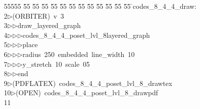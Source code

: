 %
%
\begin{tabbing}
55555 \= 55 \= 55 \= 55 \= 55 \= 55 \= 55 \= 55 \= 55 \= 55 \= 55 \= 55 \= 55 \= \>codes\_8\_4\_4\_draw:\\[0pt]
2\>$\triangleright$\>(ORBITER)\ v\ 3\ \\[0pt]
3\>$\triangleright$\>$\triangleright$\>draw\_layered\_graph\ \\[0pt]
4\>$\triangleright$\>$\triangleright$\>$\triangleright$\>codes\_8\_4\_4\_poset\_lvl\_8layered\_graph\ \\[0pt]
5\>$\triangleright$\>$\triangleright$\>$\triangleright$\>place\ \\[0pt]
6\>$\triangleright$\>$\triangleright$\>$\triangleright$\>radius\ 250\ embedded\ line\_width\ 10\ \\[0pt]
7\>$\triangleright$\>$\triangleright$\>$\triangleright$\>y\_stretch\ 10\ scale\ 05\ \\[0pt]
8\>$\triangleright$\>$\triangleright$\>end\\[0pt]
9\>$\triangleright$\>(PDFLATEX)\ codes\_8\_4\_4\_poset\_lvl\_8\_drawtex\\[0pt]
10\>$\triangleright$\>(OPEN)\ codes\_8\_4\_4\_poset\_lvl\_8\_drawpdf\\[0pt]
11\>\end{tabbing}
